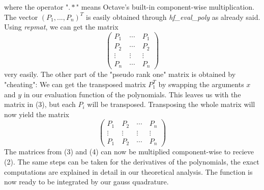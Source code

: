 \documentclass[a4paper,12pt]{article}
\begin{document}
where the operator "$.*$" means Octave's built-in component-wise multiplication. The vector $(P_1,...,P_n)^T$ is easily obtained through \textit{hf\_eval\_poly} as already said. Using \textit{repmat}, we can get the matrix
\begin{equation}\begin{pmatrix} P_1 &\ \cdots &\ P_1 \\
				   P_2 &\ \cdots &\ P_2 \\
				   \vdots &\ \vdots &\ \vdots \\ 
                   P_n &\ \cdots &\ P_n \end{pmatrix}\end{equation}
very easily. The other part of the "pseudo rank one" matrix is obtained by "cheating": We can get the transposed matrix $P_1^T$ by swapping the arguments $x$ and $y$ in our evaluation function of the polynomials. This leaves us with the matrix in (3), but each $P_i$ will be transposed. Transposing the whole matrix will now yield the matrix
\begin{equation}\begin{pmatrix} P_1 &\ P_2 &\ \cdots &\ P_n \\
				   \vdots &\ \vdots &\ \vdots &\ \vdots \\ 
                   P_1 &\ P_2 &\ \cdots &\ P_n \end{pmatrix}\end{equation}
The matrices from (3) and (4) can now be multiplied component-wise to recieve (2). The same steps can be taken for the derivatives of the polynomials, the exact computations are explained in detail in our theoretical analysis. The function is now ready to be integrated by our gauss quadrature.
\end{document}
